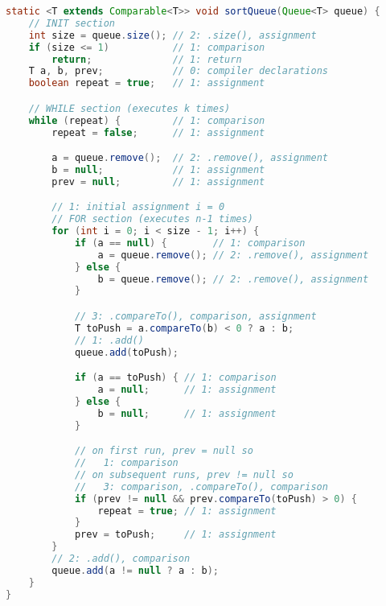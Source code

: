 \documentclass[11pt,a4paper]{article} %
\begin{document}
\newpage
\begin{lstlisting}[language=Java]
static <T extends Comparable<T>> void sortQueue(Queue<T> queue) {
    // INIT section
    int size = queue.size(); // 2: .size(), assignment
    if (size <= 1)           // 1: comparison
        return;              // 1: return
    T a, b, prev;            // 0: compiler declarations
    boolean repeat = true;   // 1: assignment

    // WHILE section (executes k times)
    while (repeat) {         // 1: comparison
        repeat = false;      // 1: assignment

        a = queue.remove();  // 2: .remove(), assignment
        b = null;            // 1: assignment
        prev = null;         // 1: assignment

        // 1: initial assignment i = 0
        // FOR section (executes n-1 times)
        for (int i = 0; i < size - 1; i++) {
            if (a == null) {        // 1: comparison
                a = queue.remove(); // 2: .remove(), assignment
            } else {
                b = queue.remove(); // 2: .remove(), assignment
            }

            // 3: .compareTo(), comparison, assignment
            T toPush = a.compareTo(b) < 0 ? a : b;
            // 1: .add()
            queue.add(toPush);

            if (a == toPush) { // 1: comparison
                a = null;      // 1: assignment
            } else {
                b = null;      // 1: assignment
            }

            // on first run, prev = null so
            //   1: comparison
            // on subsequent runs, prev != null so
            //   3: comparison, .compareTo(), comparison
            if (prev != null && prev.compareTo(toPush) > 0) {
                repeat = true; // 1: assignment
            }
            prev = toPush;     // 1: assignment
        }
        // 2: .add(), comparison
        queue.add(a != null ? a : b);
    }
}
\end{lstlisting}
\end{document}
